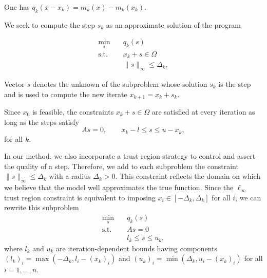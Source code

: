 One has $q_k(x-x_k)=m_k(x)-m_k(x_k)$.

We seek to compute the step $s_k$ as an approximate solution of the program

	\begin{align*}
		\min_{s} \quad& q_k(s)  \\
		\text{s.t.}  \quad & x_k+s \in \Omega \\ 
		& \|s\|_\infty \le \Delta_k,
	\end{align*}	

Vector $s$ denotes the unknown of the subproblem whose solution $s_k$ is the step and is used to compute the new iterate $x_{k+1}=x_k+s_k$.

Since $x_0$ is feasible, the constraints $x_k+s\in \Omega$ are satisfied at every iteration as long as the steps satisfy
\[As = 0, \qquad x_k-l \le s \le u-x_k,\]
for all $k$.

In our method, we also incorporate a trust-region strategy to control and assert the quality of a step. Therefore, we add to each subproblem the constraint $\|s\|_\infty \le \Delta_k$ with a radius $\Delta_k > 0$. This constraint reflects the domain on which we believe that the model well approximates the true function. Since the $\ell_\infty$ trust region constraint is equivalent to imposing $x_i \in [-\Delta_k,\Delta_k]$ for all $i$, we can rewrite this subproblem	
\begin{subequations}\label{pb:quadratic_subproblem} 
	\begin{align}
		\min_{s} \quad& q_k(s)  \\
		\text{s.t.}  \quad & As=0 \\
		& l_k \le s \le u_k,
	\end{align}	
\end{subequations}
where $l_k$ and $u_k$ are iteration-dependent bounds having components $(l_k)_i = \max\left(-\Delta_k,l_i-(x_k)_i\right)$ and $(u_k)_i = \min\left(\Delta_k,u_i-(x_k)_i\right)$ for all $i=1,\ldots,n$.

